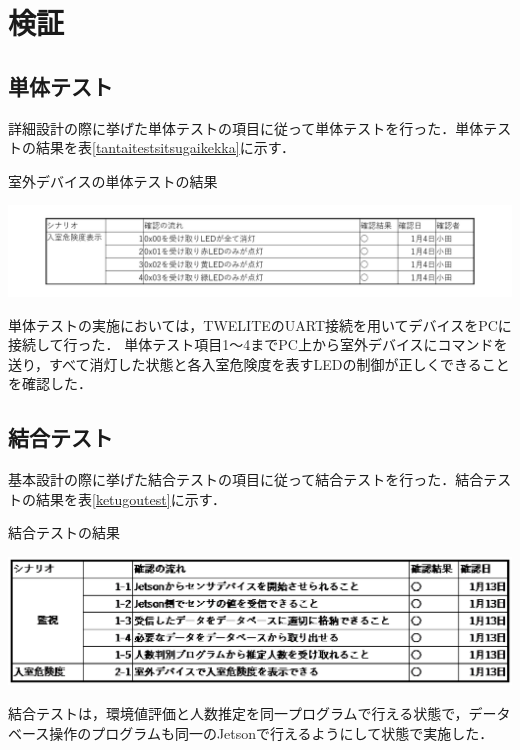 
\section{検証}

\subsection{単体テスト}

詳細設計の際に挙げた単体テストの項目に従って単体テストを行った．単体テストの結果を表\ref{tantaitestsitsugaikekka}に示す．

\begin{table}
	\centering
	\caption{室外デバイスの単体テストの結果}
	\label{tantaitestsitsugaikekka}
	\includegraphics[width=0.9\linewidth]{test/tantaitest_sitsugai_kekka2}
\end{table}

単体テストの実施においては，TWELITEのUART接続を用いてデバイスをPCに接続して行った．
単体テスト項目1～4までPC上から室外デバイスにコマンドを送り，すべて消灯した状態と各入室危険度を表すLEDの制御が正しくできることを確認した．

\subsection{結合テスト}

基本設計の際に挙げた結合テストの項目に従って結合テストを行った．結合テストの結果を表\ref{ketugoutest}に示す．

\begin{table}
	\centering
	\caption{結合テストの結果}
	\label{ketugoutest}
	\includegraphics[width=0.9\linewidth]{test/ketugoutest}
\end{table}

結合テストは，環境値評価と人数推定を同一プログラムで行える状態で，データベース操作のプログラムも同一のJetsonで行えるようにして状態で実施した．

